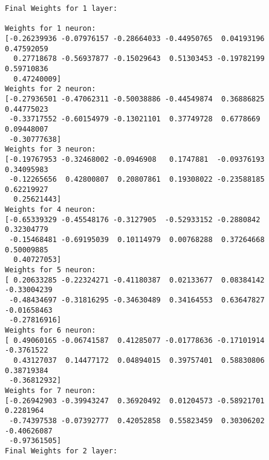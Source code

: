 \documentclass[11pt]{article}
\begin{document}
    \begin{Verbatim}[commandchars=\\\{\}]
Final Weights for 1 layer:

Weights for 1 neuron:
[-0.26239936 -0.07976157 -0.28664033 -0.44950765  0.04193196  0.47592059
  0.27718678 -0.56937877 -0.15029643  0.51303453 -0.19782199  0.59710836
  0.47240009]
Weights for 2 neuron:
[-0.27936501 -0.47062311 -0.50038886 -0.44549874  0.36886825  0.44775023
 -0.33717552 -0.60154979 -0.13021101  0.37749728  0.6778669   0.09448007
 -0.30777638]
Weights for 3 neuron:
[-0.19767953 -0.32468002 -0.0946908   0.1747881  -0.09376193  0.34095983
 -0.12265656  0.42800807  0.20807861  0.19308022 -0.23588185  0.62219927
  0.25621443]
Weights for 4 neuron:
[-0.65339329 -0.45548176 -0.3127905  -0.52933152 -0.2880842   0.32304779
 -0.15468481 -0.69195039  0.10114979  0.00768288  0.37264668  0.50009885
  0.40727053]
Weights for 5 neuron:
[ 0.20633285 -0.22324271 -0.41180387  0.02133677  0.08384142 -0.33004239
 -0.48434697 -0.31816295 -0.34630489  0.34164553  0.63647827 -0.01658463
 -0.27816916]
Weights for 6 neuron:
[ 0.49060165 -0.06741587  0.41285077 -0.01778636 -0.17101914 -0.3761522
  0.43127037  0.14477172  0.04894015  0.39757401  0.58830806  0.38719384
 -0.36812932]
Weights for 7 neuron:
[-0.26942903 -0.39943247  0.36920492  0.01204573 -0.58921701  0.2281964
 -0.74397538 -0.07392777  0.42052858  0.55823459  0.30306202 -0.40626087
 -0.97361505]
Final Weights for 2 layer:


\end{Verbatim}
\end{document}
